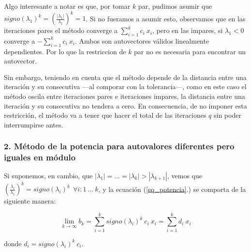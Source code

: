 \vspace{1em}
Algo interesante a notar es que, por tomar $k$ par, pudimos asumir que $signo(\lambda_1)^k = (\frac{|\lambda_{1}|}{\lambda_{1}})^k = 1$. Si no fueramos a asumir esto, observamos que en las iteraciones pares el método converge a $\sum_{i=1}^{k} c_i\ x_i$, pero en las impares, si $\lambda_1 < 0$ converge a $-\sum_{i=1}^{k} c_i\ x_i$. Ambos son autovectores válidos linealmente dependientes. Por lo que la restriccion de $k$ par no es necesaria para encontrar un autovector.

\vspace{1em}
Sin embargo, teniendo en cuenta que el método depende de la distancia entre una iteración y su consecutiva ---al comporar con la tolerancia---, como en este caso el método oscila entre iteraciones pares e iteraciones impares, la distancia entre una iteración y su consecutiva no tendera a cero. En consecuencia, de no imponer esta restricción, el método va a tener que hacer el total de las iteraciones $q$ sin poder interrumpirse antes. 










\vspace{2em}
\subsubsection*{2. Método de la potencia para autovalores diferentes pero iguales en módulo} 

Si suponemos, en cambio, que $|\lambda_1| = ... = |\lambda_k| > |\lambda_{k + 1}|$, vemos que $(\frac{\lambda_i}{\lambda_1})^k = signo(\lambda_i)^k\ \ \forall i: 1\ ...\ k$, y la ecuación (\ref{eq_potencia}.) se comporta de la siguiente manera:

\begin{equation*}
    \lim_{k \to \infty} b_k = \sum_{i=1}^{k} signo(\lambda_i)^k\ c_i\ x_i = \sum_{i=1}^{k} d_i\ x_i  
\end{equation*}

\vspace{1em}
\noindent donde $d_i = signo(\lambda_i)^k\ c_i$.




